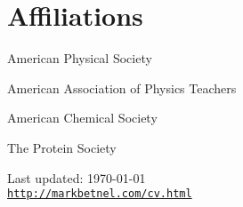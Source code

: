 \documentclass[letterpaper]{article}
\def\footerlink{http://markbetnel.com/cv.html}
\renewenvironment{itemize}{
  \begin{list}{}{
    \setlength{\leftmargin}{1.5em}
  }
}{
  \end{list}
}
\begin{document}
\section*{Affiliations}
\begin{itemize}
	\item American Physical Society
	\item American Association of Physics Teachers
	\item American Chemical Society
	\item The Protein Society
\end{itemize}

\bigskip

\begin{center}
  \begin{footnotesize}
    Last updated: \today \\
    \href{\footerlink}{\texttt{\footerlink}}
  \end{footnotesize}
\end{center}
\end{document}
